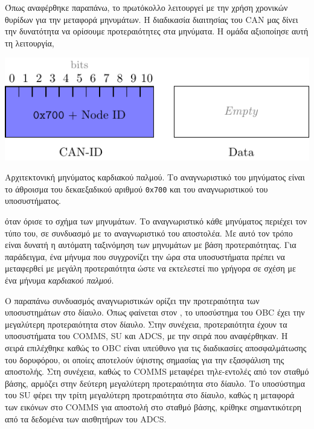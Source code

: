 \documentclass[a4paper,nobib,justified]{tufte-book}
\begin{document}
Όπως αναφέρθηκε παραπάνω, το πρωτόκολλο λειτουργεί με την χρήση χρονικών θυρίδων για την μεταφορά μηνυμάτων. Η διαδικασία διαιτησίας του CAN μας δίνει την δυνατότητα να ορίσουμε προτεραιότητες στα μηνύματα. Η ομάδα αξιοποίησε αυτή τη λειτουργία, 
\begin{marginfigure}
	\includegraphics[width=0.9\linewidth]{media/diagrams/heartbeat-message.pdf}
	\label{fig:heartbeat-message}
	\caption[Αρχιτεκτονική μηνύματος καρδιακού παλμού]{Αρχιτεκτονική μηνύματος καρδιακού παλμού. Το αναγνωριστικό του μηνύματος είναι το άθροισμα του δεκαεξαδικού αριθμού \texttt{0x700} και του αναγνωριστικού του υποσυστήματος.}
\end{marginfigure}\FloatBarrier όταν όρισε το σχήμα των μηνυμάτων. Το αναγνωριστικό κάθε μηνύματος περιέχει τον τύπο του, σε συνδυασμό με το αναγνωριστικό του αποστολέα. Με αυτό τον τρόπο είναι δυνατή η αυτόματη ταξινόμηση των μηνυμάτων με βάση προτεραιότητας. Για παράδειγμα, ένα μήνυμα που συγχρονίζει την ώρα στα υποσυστήματα πρέπει να μεταφερθεί με μεγάλη προτεραιότητα ώστε να εκτελεστεί πιο γρήγορα σε σχέση με ένα μήνυμα \textit{καρδιακού παλμού}.

Ο παραπάνω συνδυασμός αναγνωριστικών ορίζει την προτεραιότητα των υποσυστημάτων στο δίαυλο. Όπως φαίνεται στον  , το υποσύστημα του OBC έχει την μεγαλύτερη προτεραιότητα στον δίαυλο. Στην συνέχεια, προτεραιότητα έχουν τα υποσυστήματα του COMMS, SU και ADCS, με την σειρά που αναφέρθηκαν. Η σειρά επιλέχθηκε καθώς το OBC είναι υπεύθυνο για τις διαδικασίες αποσφαλμάτωσης του δορυφόρου, οι οποίες αποτελούν ύψιστης σημασίας για την εξασφάλιση της αποστολής. Στη συνέχεια, καθώς το COMMS μεταφέρει τηλε-εντολές από τον σταθμό βάσης, αρμόζει στην δεύτερη μεγαλύτερη προτεραιότητα στο δίαυλο. Το υποσύστημα του SU φέρει την τρίτη μεγαλύτερη προτεραιότητα στο δίαυλο, καθώς η μεταφορά των εικόνων στο COMMS για αποστολή στο σταθμό βάσης, κρίθηκε σημαντικότερη από τα δεδομένα των αισθητήρων του ADCS.
\end{document}
